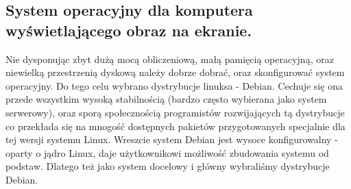 \subsection{System operacyjny dla komputera wyświetlającego obraz na ekranie.}

Nie dysponując zbyt dużą mocą obliczeniową, małą pamięcią operacyjną, oraz niewielką przestrzenią dyskową należy dobrze dobrać, oraz skonfigurować system operacyjny. Do tego celu wybrano dystrybucje linuksa - Debian. Cechuje się ona przede wszystkim wysoką stabilnością (bardzo często wybierana jako system serwerowy), oraz sporą społecznością programistów rozwijających tą dystrybucje co przekłada się na mnogość dostępnych pakietów przygotowanych specjalnie dla tej wersji systemu Linux. Wreszcie system Debian jest wysoce konfigurowalny - oparty o jądro Linux, daje użytkownikowi możliwość zbudowania systemu od podstaw. Dlatego też jako system docelowy i główny wybraliśmy dystrybucje Debian.






